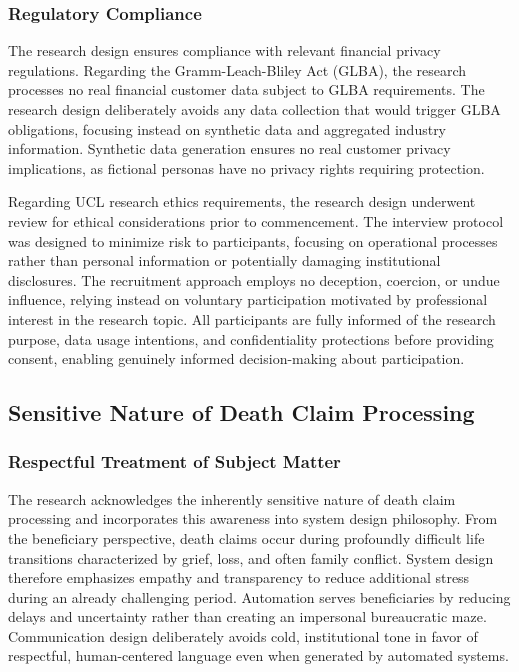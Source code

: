 \subsubsection{Regulatory Compliance}

The research design ensures compliance with relevant financial privacy regulations. Regarding the Gramm-Leach-Bliley Act (GLBA), the research processes no real financial customer data subject to GLBA requirements. The research design deliberately avoids any data collection that would trigger GLBA obligations, focusing instead on synthetic data and aggregated industry information. Synthetic data generation ensures no real customer privacy implications, as fictional personas have no privacy rights requiring protection.

Regarding UCL research ethics requirements, the research design underwent review for ethical considerations prior to commencement. The interview protocol was designed to minimize risk to participants, focusing on operational processes rather than personal information or potentially damaging institutional disclosures. The recruitment approach employs no deception, coercion, or undue influence, relying instead on voluntary participation motivated by professional interest in the research topic. All participants are fully informed of the research purpose, data usage intentions, and confidentiality protections before providing consent, enabling genuinely informed decision-making about participation.

\subsection{Sensitive Nature of Death Claim Processing}

\subsubsection{Respectful Treatment of Subject Matter}

The research acknowledges the inherently sensitive nature of death claim processing and incorporates this awareness into system design philosophy. From the beneficiary perspective, death claims occur during profoundly difficult life transitions characterized by grief, loss, and often family conflict. System design therefore emphasizes empathy and transparency to reduce additional stress during an already challenging period. Automation serves beneficiaries by reducing delays and uncertainty rather than creating an impersonal bureaucratic maze. Communication design deliberately avoids cold, institutional tone in favor of respectful, human-centered language even when generated by automated systems.


